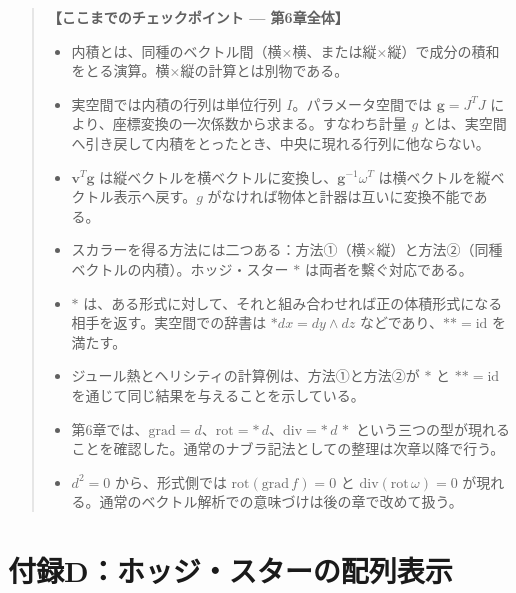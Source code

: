 \documentclass[a4paper,12pt,openany]{book}
\begin{document}
\begin{quote}
\textbf{【ここまでのチェックポイント — 第6章全体】}

\begin{itemize}
\item
  内積とは、同種のベクトル間（横×横、または縦×縦）で成分の積和をとる演算。横×縦の計算とは別物である。
\item
  実空間では内積の行列は単位行列 \(I\)。パラメータ空間では
  \(\mathbf{g}=J^T J\)
  により、座標変換の一次係数から求まる。すなわち計量 \(g\)
  とは、実空間へ引き戻して内積をとったとき、中央に現れる行列に他ならない。
\item
  \(\mathbf{v}^T \mathbf{g}\)
  は縦ベクトルを横ベクトルに変換し、\(\mathbf{g}^{-1}\omega^T\)
  は横ベクトルを縦ベクトル表示へ戻す。\(g\)
  がなければ物体と計器は互いに変換不能である。
\item
  スカラーを得る方法には二つある：方法①（横×縦）と方法②（同種ベクトルの内積）。ホッジ・スター
  \(\ast\) は両者を繫ぐ対応である。
\item
  \(\ast\)
  は、ある形式に対して、それと組み合わせれば正の体積形式になる相手を返す。実空間での辞書は
  \(\ast dx = dy \wedge dz\) などであり、\(\ast\ast = \mathrm{id}\)
  を満たす。
\item
  ジュール熱とヘリシティの計算例は、方法①と方法②が \(\ast\) と
  \(\ast\ast = \mathrm{id}\) を通じて同じ結果を与えることを示している。
\item
  第6章では、\(\mathrm{grad}=d\)、\(\mathrm{rot}=\ast\,d\)、\(\mathrm{div}=\ast\,d\,\ast\)
  という三つの型が現れることを確認した。通常のナブラ記法としての整理は次章以降で行う。
\item
  \(d^2=0\) から、形式側では \(\mathrm{rot}(\mathrm{grad}\,f)=0\) と
  \(\mathrm{div}(\mathrm{rot}\,\omega)=0\)
  が現れる。通常のベクトル解析での意味づけは後の章で改めて扱う。
\end{itemize}
\end{quote}

\par\vspace{0.35em}\par

\hypertarget{ux4ed8ux9332dux30dbux30c3ux30b8ux30b9ux30bfux30fcux306eux914dux5217ux8868ux793a}{%
\section{付録D：ホッジ・スターの配列表示}\label{ux4ed8ux9332dux30dbux30c3ux30b8ux30b9ux30bfux30fcux306eux914dux5217ux8868ux793a}}
\end{document}
